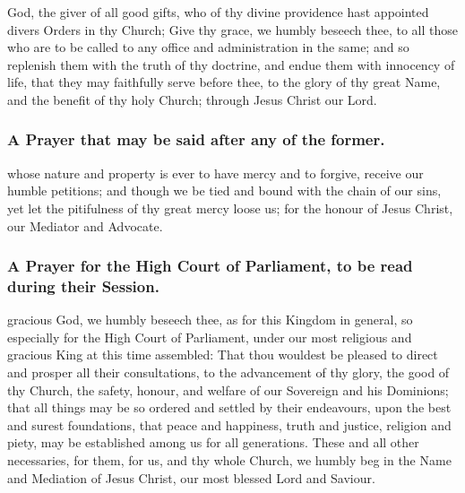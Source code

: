  God, the giver of all good gifts, who of thy divine providence hast appointed divers Orders in thy Church; Give thy grace, we humbly beseech thee, to all those who are to be called to any office and administration in the same; and so replenish them with the truth of thy doctrine, and endue them with innocency of life, that they may faithfully serve before thee, to the glory of thy great Name, and the benefit of thy holy Church; through Jesus Christ our Lord.

\subsubsection{A Prayer that may be said after any of the former.}
 whose nature and property is ever to have mercy and to forgive, receive our humble petitions; and though we be tied and bound with the chain of our sins, yet let the pitifulness of thy great mercy loose us; for the honour of Jesus Christ, our Mediator and Advocate.

\subsubsection{A Prayer for the High Court of Parliament, to be read during their Session.}
 gracious God, we humbly beseech thee, as for this Kingdom in general, so especially for the High Court of Parliament, under our most religious and gracious King at this time assembled: That thou wouldest be pleased to direct and prosper all their consultations, to the advancement of thy glory, the good of thy Church, the safety, honour, and welfare of our Sovereign and his Dominions; that all things may be so ordered and settled by their endeavours, upon the best and surest foundations, that peace and happiness, truth and justice, religion and piety, may be established among us for all generations. These and all other necessaries, for them, for us, and thy whole Church, we humbly beg in the Name and Mediation of Jesus Christ, our most blessed Lord and Saviour.

